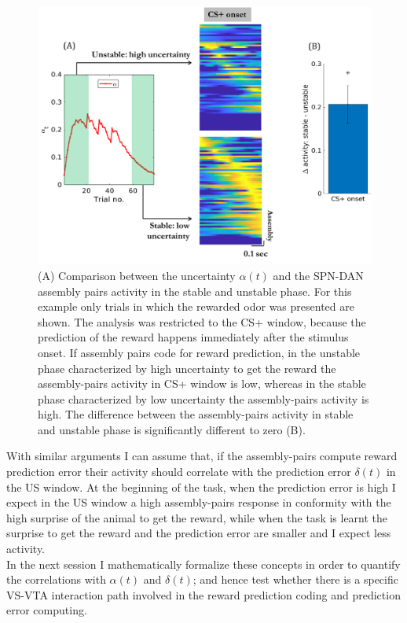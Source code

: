 \begin{figure}[H]
    \centering
 \includegraphics[scale=0.57]{figures/PreRegress.png}
 \caption{(A) Comparison between the uncertainty $\alpha(t)$ and the SPN-DAN assembly pairs activity in the stable and unstable phase. For this example only trials in which the rewarded odor was presented are shown. The analysis was restricted to the CS+ window, because the prediction of the reward happens immediately after the stimulus onset. If assembly pairs code for reward prediction, in the unstable phase characterized by high uncertainty to get the reward the assembly-pairs activity in CS+ window is low, whereas in the stable phase characterized by low uncertainty the assembly-pairs activity is high. The difference between the assembly-pairs activity in stable and unstable phase is significantly different to zero (B).}
\label{fig:StableUnstableAlphaCS}
\end{figure}With similar arguments I can assume that, if the assembly-pairs compute reward prediction error their activity should correlate with the prediction error $\delta(t)$ in the US window. At the beginning of the task, when the prediction error is high I expect in the US window a high assembly-pairs response in conformity with the high surprise of the animal to get the reward, while when the task is learnt the surprise to get the reward and the prediction error are smaller and I expect less activity.\\In the next session I mathematically formalize these concepts in order to quantify the correlations with $\alpha(t)$ and $\delta(t)$; and hence test whether there is a specific VS-VTA interaction path involved in the reward prediction coding and prediction error computing. 

